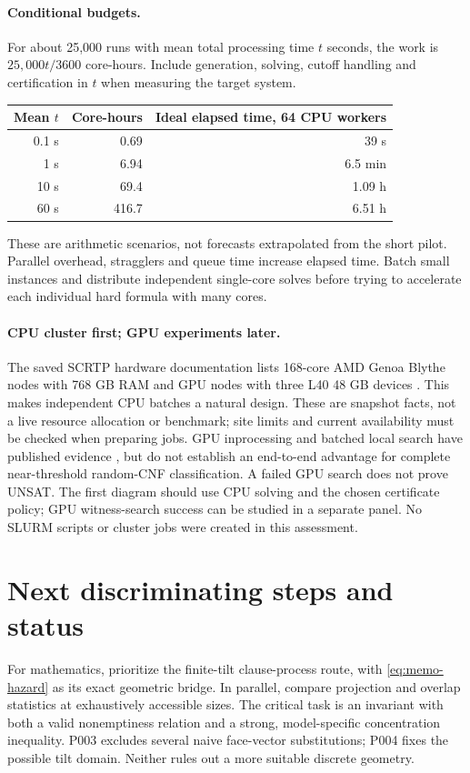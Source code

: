 \documentclass[11pt,a4paper]{article}
\begin{document}
\paragraph{Conditional budgets.}
For about 25,000 runs with mean total processing time $t$ seconds, the work
is $25{,}000t/3600$ core-hours. Include generation, solving, cutoff handling
and certification in $t$ when measuring the target system.
\begin{center}\small
\begin{tabular}{@{}rrr@{}}
\toprule
Mean $t$ & Core-hours & Ideal elapsed time, 64 CPU workers\\
\midrule
0.1 s & 0.69 & 39 s\\
1 s & 6.94 & 6.5 min\\
10 s & 69.4 & 1.09 h\\
60 s & 416.7 & 6.51 h\\
\bottomrule
\end{tabular}
\end{center}
These are arithmetic scenarios, not forecasts extrapolated from the short
pilot. Parallel overhead, stragglers and queue time increase elapsed time.
Batch small instances and distribute independent single-core solves before
trying to accelerate each individual hard formula with many cores.

\paragraph{CPU cluster first; GPU experiments later.}
The saved SCRTP hardware documentation lists 168-core AMD Genoa Blythe
nodes with 768 GB RAM and GPU nodes with three L40 48 GB devices
\citep{scrtpHardware}. This makes independent CPU batches a natural design.
These are snapshot facts, not a live resource allocation or benchmark;
site limits and current availability must be checked when preparing jobs.
GPU inprocessing and batched local search have published evidence
\citep{osama2024,cen2025}, but do not establish an end-to-end advantage for
complete near-threshold random-CNF classification. A failed GPU search
does not prove UNSAT. The first diagram should use CPU solving and the
chosen certificate policy; GPU witness-search success can be studied in a
separate panel. No SLURM scripts or cluster jobs were created in this assessment.

\section{Next discriminating steps and status}
For mathematics, prioritize the finite-tilt clause-process route, with
\eqref{eq:memo-hazard} as its exact geometric bridge. In parallel, compare
projection and overlap statistics at exhaustively accessible sizes. The
critical task is an invariant with both a valid nonemptiness relation and
a strong, model-specific concentration inequality. P003 excludes several
naive face-vector substitutions; P004 fixes the possible tilt domain.
Neither rules out a more suitable discrete geometry.
\end{document}
